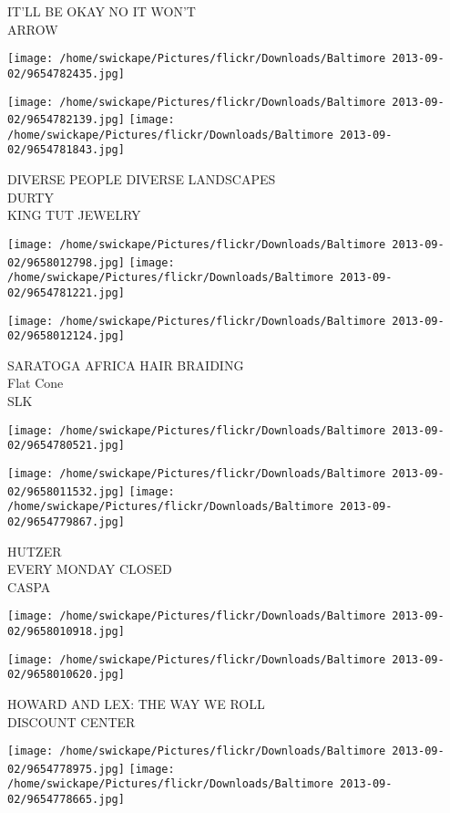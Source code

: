 \documentclass[10pt,letterpaper]{article}
\begin{document}
IT'LL BE OKAY NO IT WON'T\\
ARROW
\pagebreak

\texttt{[image: /home/swickape/Pictures/flickr/Downloads/Baltimore 2013-09-02/9654782435.jpg]}

\vspace{0.25in}
\texttt{[image: /home/swickape/Pictures/flickr/Downloads/Baltimore 2013-09-02/9654782139.jpg]}
\texttt{[image: /home/swickape/Pictures/flickr/Downloads/Baltimore 2013-09-02/9654781843.jpg]}

DIVERSE PEOPLE DIVERSE LANDSCAPES\\
DURTY\\
KING TUT JEWELRY
\pagebreak

\texttt{[image: /home/swickape/Pictures/flickr/Downloads/Baltimore 2013-09-02/9658012798.jpg]}
\texttt{[image: /home/swickape/Pictures/flickr/Downloads/Baltimore 2013-09-02/9654781221.jpg]}

\vspace{0.25in}
\texttt{[image: /home/swickape/Pictures/flickr/Downloads/Baltimore 2013-09-02/9658012124.jpg]}

SARATOGA AFRICA HAIR BRAIDING\\
Flat Cone\\
SLK
\pagebreak

\texttt{[image: /home/swickape/Pictures/flickr/Downloads/Baltimore 2013-09-02/9654780521.jpg]}

\vspace{0.25in}
\texttt{[image: /home/swickape/Pictures/flickr/Downloads/Baltimore 2013-09-02/9658011532.jpg]}
\texttt{[image: /home/swickape/Pictures/flickr/Downloads/Baltimore 2013-09-02/9654779867.jpg]}

HUTZER\\
EVERY MONDAY CLOSED\\
CASPA
\pagebreak

\texttt{[image: /home/swickape/Pictures/flickr/Downloads/Baltimore 2013-09-02/9658010918.jpg]}

\vspace{0.25in}
\texttt{[image: /home/swickape/Pictures/flickr/Downloads/Baltimore 2013-09-02/9658010620.jpg]}

HOWARD AND LEX: THE WAY WE ROLL\\
DISCOUNT CENTER
\pagebreak

\texttt{[image: /home/swickape/Pictures/flickr/Downloads/Baltimore 2013-09-02/9654778975.jpg]}
\texttt{[image: /home/swickape/Pictures/flickr/Downloads/Baltimore 2013-09-02/9654778665.jpg]}
\end{document}
